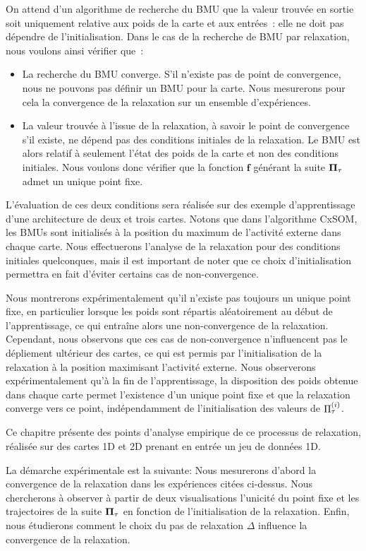\documentclass[../main]{subfiles}
\begin{document}
On attend d'un algorithme de recherche du BMU que la valeur trouvée en sortie soit uniquement relative aux poids de la carte et aux entrées~: elle ne doit pas dépendre de l'initialisation.
Dans le cas de la recherche de BMU par relaxation, nous voulons ainsi vérifier que~:

\begin{itemize}
	\item La recherche du BMU converge. S'il n'existe pas de point de convergence, nous ne pouvons pas définir un BMU pour la carte. Nous mesurerons pour cela la convergence de la relaxation sur un ensemble d'expériences.
	\item La valeur trouvée à l'issue de la relaxation, à savoir le point de convergence s'il existe, ne dépend pas des conditions initiales de la relaxation. 
	Le BMU est alors relatif à seulement l'état des poids de la carte et non des conditions initiales. Nous voulons donc vérifier que la fonction $\mathbf{f}$ générant la suite $\mathbf{\Pi}_\tau$ admet un unique point fixe.
\end{itemize}
L'évaluation de ces deux conditions sera réalisée sur des exemple d'apprentissage d'une architecture de deux et trois cartes. 
Notons que dans l'algorithme CxSOM, les BMUs sont initialisés à la position du maximum de l'activité externe dans chaque carte. 
Nous effectuerons l'analyse de la relaxation pour des conditions initiales quelconques, mais il est important de noter que ce choix d'initialisation permettra en fait d'éviter certains cas de non-convergence.

Nous montrerons expérimentalement qu'il n'existe pas toujours un unique point fixe, en particulier lorsque les poids sont répartis aléatoirement au début de l'apprentissage, ce qui entraîne alors une non-convergence de la relaxation. 
Cependant, nous observons que ces cas de non-convergence n'influencent pas le dépliement ultérieur des cartes, ce qui est permis par l'initialisation de la relaxation à la position maximisant l'activité externe.
Nous observerons expérimentalement qu'à la fin de l'apprentissage, la disposition des poids obtenue dans chaque carte permet l'existence d'un unique point fixe et que la relaxation converge vers ce point, indépendamment de l'initialisation des valeurs de $\Pi^{({i})}_{\tau}$.

Ce chapitre présente des points d'analyse empirique de ce processus de relaxation, réalisée sur des cartes 1D et 2D prenant en entrée un jeu de données 1D.

La démarche expérimentale est la suivante:
Nous mesurerons d'abord la convergence de la relaxation dans les expériences citées ci-dessus.
Nous chercherons à observer à partir de deux visualisations l'unicité du point fixe et les trajectoires de la suite $\mathbf{\Pi}_\tau$ en fonction de l'initialisation de la relaxation.
Enfin, nous étudierons comment le choix du pas de relaxation $\Delta$ influence la convergence de la relaxation.
\end{document}
